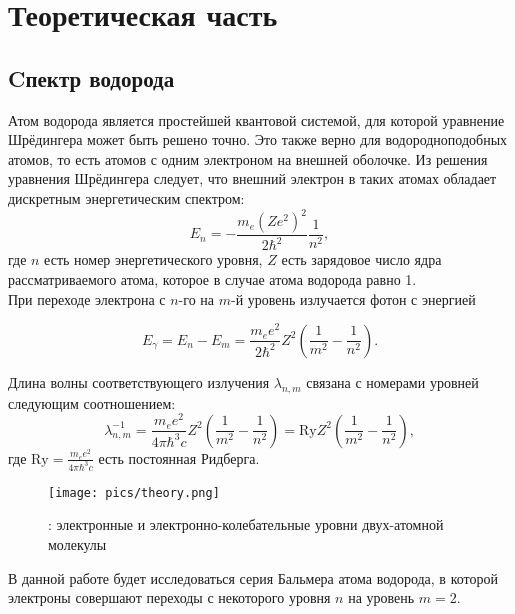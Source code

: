 \section{Теоретическая часть}

        \subsection{Cпектр водорода}
        
        Атом водорода является простейшей квантовой системой, для которой уравнение Шрёдингера может быть решено точно. Это также верно для водородноподобных атомов, то есть атомов с одним электроном на внешней оболочке. Из решения уравнения Шрёдингера следует, что внешний электрон в таких атомах обладает дискретным энергетическим спектром:  
        \begin{equation}
            E_n = - \frac{m_e (Z e^2)^2}{2\hbar^2}\frac{1}{n^2},
        \end{equation}
        где $n$ есть номер энергетического уровня, $Z$ есть зарядовое число ядра рассматриваемого атома, которое в случае атома водорода равно 1.\\
        При переходе электрона с $n$-го на $m$-й уровень излучается фотон с энергией
        
		\begin{equation}
            E_\gamma = E_n - E_m = \frac{m_ee^2}{2\hbar^2}Z^2\left(\frac{1}{m^2} - \frac{1}{n^2}\right).
        \end{equation}
        
		Длина волны  соответствующего излучения $\lambda_{n,m}$ связана с номерами уровней следующим соотношением:
        \begin{equation}
            \label{eq:Ry}
            \lambda_{n,m}^{-1} =\frac{m_ee^2}{4\pi\hbar^3c}Z^2\left(\frac{1}{m^2}-\frac{1}{n^2}\right) = \text{Ry} Z^2 \left(\frac{1}{m^2}-\frac{1}{n^2}\right),
        \end{equation}
        где $\text{Ry} = \frac{m_ee^2}{4\pi\hbar^3c}$ есть постоянная Ридберга.

		\begin{figure}[h!]
            \centering
            \texttt{[image: pics/theory.png]}
            \caption{ : электронные и электронно-колебательные уровни двух-атомной молекулы}
            \label{theor}
        \end{figure}

        В данной работе будет исследоваться серия Бальмера атома водорода, в которой электроны совершают переходы с некоторого уровня $n$ на уровень $m = 2$.


